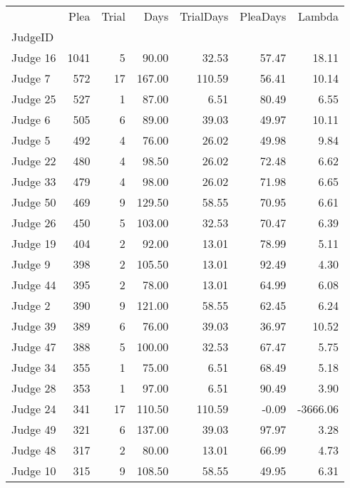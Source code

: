 \begin{tabular}{lrrrrrr}
\toprule
{} &  Plea &  Trial &   Days &  TrialDays &  PleaDays &   Lambda \\
JudgeID  &       &        &        &            &           &          \\
\midrule
Judge 16 &  1041 &      5 &  90.00 &      32.53 &     57.47 &    18.11 \\
Judge 7  &   572 &     17 & 167.00 &     110.59 &     56.41 &    10.14 \\
Judge 25 &   527 &      1 &  87.00 &       6.51 &     80.49 &     6.55 \\
Judge 6  &   505 &      6 &  89.00 &      39.03 &     49.97 &    10.11 \\
Judge 5  &   492 &      4 &  76.00 &      26.02 &     49.98 &     9.84 \\
Judge 22 &   480 &      4 &  98.50 &      26.02 &     72.48 &     6.62 \\
Judge 33 &   479 &      4 &  98.00 &      26.02 &     71.98 &     6.65 \\
Judge 50 &   469 &      9 & 129.50 &      58.55 &     70.95 &     6.61 \\
Judge 26 &   450 &      5 & 103.00 &      32.53 &     70.47 &     6.39 \\
Judge 19 &   404 &      2 &  92.00 &      13.01 &     78.99 &     5.11 \\
Judge 9  &   398 &      2 & 105.50 &      13.01 &     92.49 &     4.30 \\
Judge 44 &   395 &      2 &  78.00 &      13.01 &     64.99 &     6.08 \\
Judge 2  &   390 &      9 & 121.00 &      58.55 &     62.45 &     6.24 \\
Judge 39 &   389 &      6 &  76.00 &      39.03 &     36.97 &    10.52 \\
Judge 47 &   388 &      5 & 100.00 &      32.53 &     67.47 &     5.75 \\
Judge 34 &   355 &      1 &  75.00 &       6.51 &     68.49 &     5.18 \\
Judge 28 &   353 &      1 &  97.00 &       6.51 &     90.49 &     3.90 \\
Judge 24 &   341 &     17 & 110.50 &     110.59 &     -0.09 & -3666.06 \\
Judge 49 &   321 &      6 & 137.00 &      39.03 &     97.97 &     3.28 \\
Judge 48 &   317 &      2 &  80.00 &      13.01 &     66.99 &     4.73 \\
Judge 10 &   315 &      9 & 108.50 &      58.55 &     49.95 &     6.31 \\

\end{tabular}
